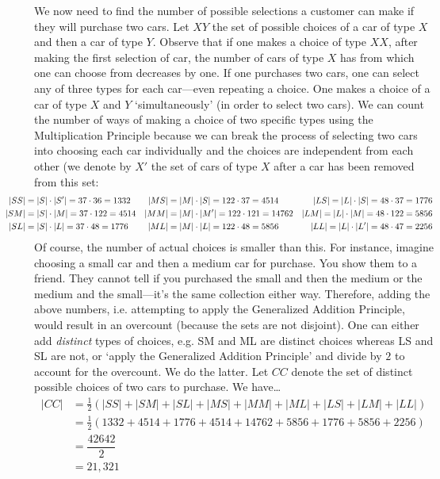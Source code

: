 \documentclass[11pt,letterpaper]{article}
\begin{document}
We now need to find the number of possible selections a customer can make if they will purchase two cars. Let $XY$ the set of possible choices of a car of type $X$ and then a car of type $Y$. Observe that if one makes a choice of type $XX$, after making the first selection of car, the number of cars of type $X$ has from which one can choose from decreases by one. If one purchases two cars, one can select any of three types for each car---even repeating a choice. One makes a choice of a car of type $X$ and $Y$ `simultaneously' (in order to select two cars). We can count the number of ways of making a choice of two specific types using the Multiplication Principle because we can break the process of selecting two cars into choosing each car individually and the choices are independent from each other (we denote by $X'$ the set of cars of type $X$ after a car has been removed from this set: 
	\[
	\begin{aligned}
	\hspace{-1.2cm} |SS|&= |S| \cdot |S'|= 37 \cdot 36= 1332 & |MS|&= |M| \cdot |S|= 122 \cdot 37= 4514 & |LS|= |L| \cdot |S|= 48 \cdot 37= 1776 \\
	\hspace{-1.2cm} |SM|&= |S| \cdot |M|= 37 \cdot 122= 4514 & |MM|&= |M| \cdot |M'|= 122 \cdot 121= 14762 & |LM|= |L| \cdot |M|= 48 \cdot 122= 5856 \\
	\hspace{-1.2cm} |SL|&= |S| \cdot |L|= 37 \cdot 48= 1776 & |ML|&= |M| \cdot |L|= 122 \cdot 48= 5856 & |LL|= |L| \cdot |L'|= 48 \cdot 47= 2256 
	\end{aligned}
	\]
Of course, the number of actual choices is smaller than this. For instance, imagine choosing a small car and then a medium car for purchase. You show them to a friend. They cannot tell if you purchased the small and then the medium or the medium and the small---it's the same collection either way. Therefore, adding the above numbers, i.e. attempting to apply the Generalized Addition Principle, would result in an overcount (because the sets are not disjoint). One can either add \textit{distinct} types of choices, e.g. SM and ML are distinct choices whereas LS and SL are not, or `apply the Generalized Addition Principle' and divide by $2$ to account for the overcount. We do the latter. Let $CC$ denote the set of distinct possible choices of two cars to purchase. We have\dots
	\[
	\begin{aligned}
	|CC|&= \frac{1}{2} (|SS| + |SM| + |SL| + |MS| + |MM| + |ML| + |LS| + |LM| + |LL| ) \\
	&= \frac{1}{2} (1332 + 4514 + 1776 + 4514 + 14762 + 5856 + 1776 + 5856 + 2256) \\
	&= \dfrac{42642}{2} \\
	&= 21,\!321
	\end{aligned}
	\]
\end{document}
